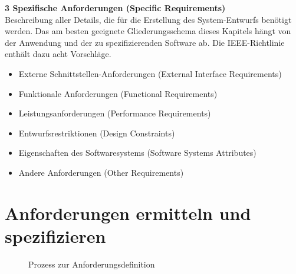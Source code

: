 \textbf{3 Spezifische Anforderungen (Specific Requirements)} \\
Beschreibung aller Details, die für die Erstellung des System-Entwurfs benötigt werden. Das am besten geeignete Gliederungsschema dieses Kapitels 
hängt von der Anwendung und der zu spezifizierenden Software ab. Die IEEE-Richtlinie enthält dazu acht Vorschläge.\\
\begin{itemize}
	\item Externe Schnittstellen-Anforderungen (External Interface Requirements)
	\item Funktionale Anforderungen (Functional Requirements)
	\item Leistungsanforderungen (Performance Requirements)
	\item Entwurfsrestriktionen (Design Constraints)
	\item Eigenschaften des Softwaresystems (Software Systems Attributes)
	\item Andere Anforderungen (Other Requirements)
\end{itemize}

\section{Anforderungen ermitteln und spezifizieren}
\begin{figure}[ht]
	\centering
	\caption[]{Prozess zur Anforderungsdefinition}
\end{figure}

